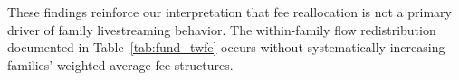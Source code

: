 \documentclass[12pt]{article}
\begin{document}
These findings reinforce our interpretation that fee reallocation is not a primary driver of family livestreaming behavior. The within-family flow redistribution documented in Table~\ref{tab:fund_twfe} occurs without systematically increasing families' weighted-average fee structures.

\end{document}
